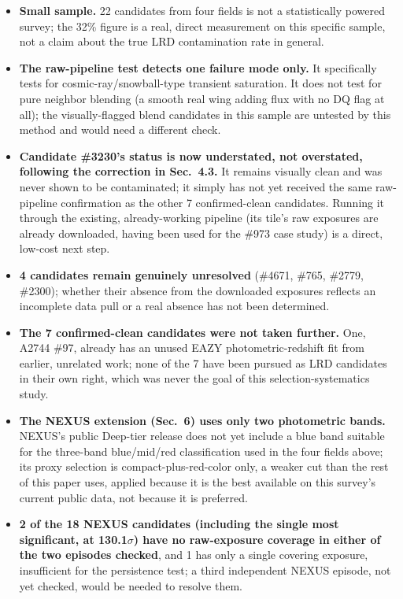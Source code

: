 \documentclass[11pt]{article}
\begin{document}
\begin{itemize}
    \item \textbf{Small sample.} 22 candidates from four fields is not a
    statistically powered survey; the 32\% figure is a real, direct measurement
    on this specific sample, not a claim about the true LRD contamination rate in
    general.
    \item \textbf{The raw-pipeline test detects one failure mode only.} It
    specifically tests for cosmic-ray/snowball-type transient saturation. It does
    not test for pure neighbor blending (a smooth real wing adding flux with no
    DQ flag at all); the visually-flagged blend candidates in this sample are
    untested by this method and would need a different check.
    \item \textbf{Candidate \#3230's status is now understated, not overstated,
    following the correction in Sec.~4.3.} It remains visually clean and was
    never shown to be contaminated; it simply has not yet received the same
    raw-pipeline confirmation as the other 7 confirmed-clean candidates. Running
    it through the existing, already-working pipeline (its tile's raw exposures
    are already downloaded, having been used for the \#973 case study) is a
    direct, low-cost next step.
    \item \textbf{4 candidates remain genuinely unresolved} (\#4671, \#765,
    \#2779, \#2300); whether their absence from the downloaded exposures
    reflects an incomplete data pull or a real absence has not been determined.
    \item \textbf{The 7 confirmed-clean candidates were not taken further.} One,
    A2744 \#97, already has an unused EAZY photometric-redshift fit from earlier,
    unrelated work; none of the 7 have been pursued as LRD candidates in their
    own right, which was never the goal of this selection-systematics study.
    \item \textbf{The NEXUS extension (Sec.~6) uses only two photometric bands.}
    NEXUS's public Deep-tier release does not yet include a blue band suitable
    for the three-band blue/mid/red classification used in the four fields
    above; its proxy selection is compact-plus-red-color only, a weaker cut than
    the rest of this paper uses, applied because it is the best available on
    this survey's current public data, not because it is preferred.
    \item \textbf{2 of the 18 NEXUS candidates (including the single most
    significant, at 130.1$\sigma$) have no raw-exposure coverage in either of
    the two episodes checked}, and 1 has only a single covering exposure,
    insufficient for the persistence test; a third independent NEXUS episode,
    not yet checked, would be needed to resolve them.
\end{itemize}
\end{document}
